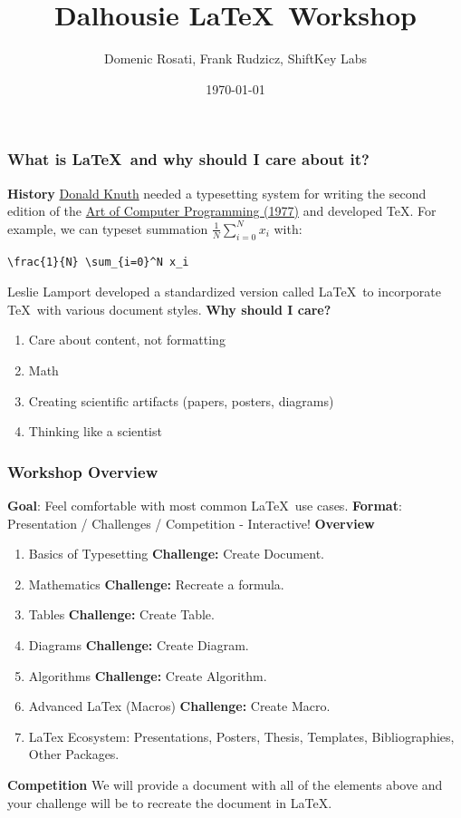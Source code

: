 \documentclass{beamer}
\title{Dalhousie \LaTeX \ Workshop} %
\author{Domenic Rosati, Frank Rudzicz, ShiftKey Labs}
\institute{Dalhousie University}
\date{\today}
\begin{document}
\frame{\titlepage}

\begin{frame}[fragile]
\frametitle{What is \LaTeX \ and why should I care about it?}

\textbf{History}
\href{https://www-cs-faculty.stanford.edu/~knuth/}{Donald Knuth} needed a typesetting system for writing the second edition of the \href{https://www-cs-faculty.stanford.edu/~knuth/taocp.html}{Art of Computer Programming (1977)} and developed \TeX. For example, we can typeset  summation $\frac{1}{N} \sum_{i=0}^N x_i$ with:
\\
\begin{verbatim}
\frac{1}{N} \sum_{i=0}^N x_i
\end{verbatim}
Leslie Lamport developed a standardized version called \LaTeX\ to incorporate \TeX \ with various document styles.
\vfill
\textbf{Why should I care?}
\begin{enumerate}
    \item Care about content, not formatting
    \item Math
    \item Creating scientific artifacts (papers, posters, diagrams)
    \item Thinking like a scientist
\end{enumerate}
\end{frame}
\begin{frame}
\frametitle{Workshop Overview}


\textbf{Goal}: Feel comfortable with most common \LaTeX \ use cases.
\vfill
\textbf{Format}: Presentation / Challenges / Competition - Interactive!
\vfill
\textbf{Overview}
\begin{enumerate}
    \item Basics of Typesetting \hfill \textbf{Challenge:} Create Document.
    \item Mathematics \hfill \textbf{Challenge:} Recreate a formula.
    \item Tables \hfill \textbf{Challenge:} Create Table.
    \item Diagrams \hfill \textbf{Challenge:} Create Diagram.
     \item Algorithms \hfill \textbf{Challenge:} Create Algorithm.
    \item Advanced LaTex (Macros) \hfill \textbf{Challenge:} Create Macro.
    \item LaTex Ecosystem: Presentations, Posters, Thesis, Templates, Bibliographies, Other Packages.
\end{enumerate}
\vfill
\textbf{Competition}
We will provide a document with all of the elements above and your challenge will be to recreate the document in \LaTeX.
\end{frame}
\end{document}
